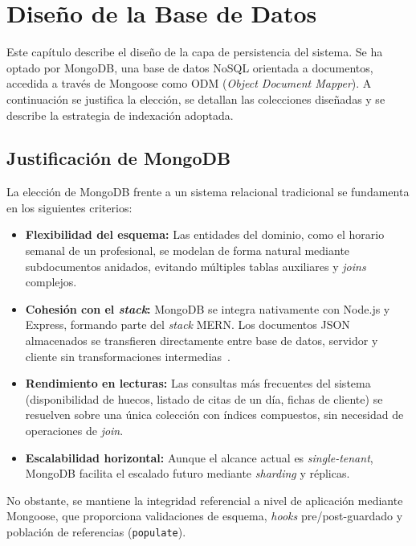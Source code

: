 
\chapter{Dise\~no de la Base de Datos}\label{cap:diseno-bd}

Este cap\'itulo describe el dise\~no de la capa de persistencia del sistema. Se ha optado por MongoDB, una base de datos NoSQL orientada a documentos, accedida a trav\'es de Mongoose como ODM (\textit{Object Document Mapper}). A continuaci\'on se justifica la elecci\'on, se detallan las colecciones dise\~nadas y se describe la estrategia de indexaci\'on adoptada.

\section{Justificaci\'on de MongoDB}\label{sec:justificacion-mongo}

La elecci\'on de MongoDB frente a un sistema relacional tradicional se fundamenta en los siguientes criterios:

\begin{itemize}
    \item \textbf{Flexibilidad del esquema:} Las entidades del dominio, como el horario semanal de un profesional, se modelan de forma natural mediante subdocumentos anidados, evitando m\'ultiples tablas auxiliares y \textit{joins} complejos.
    \item \textbf{Cohesi\'on con el \textit{stack}:} MongoDB se integra nativamente con Node.js y Express, formando parte del \textit{stack} MERN. Los documentos JSON almacenados se transfieren directamente entre base de datos, servidor y cliente sin transformaciones intermedias~\cite{mongodb_docs}.
    \item \textbf{Rendimiento en lecturas:} Las consultas m\'as frecuentes del sistema (disponibilidad de huecos, listado de citas de un d\'ia, fichas de cliente) se resuelven sobre una \'unica colecci\'on con \'indices compuestos, sin necesidad de operaciones de \textit{join}.
    \item \textbf{Escalabilidad horizontal:} Aunque el alcance actual es \textit{single-tenant}, MongoDB facilita el escalado futuro mediante \textit{sharding} y r\'eplicas.
\end{itemize}

No obstante, se mantiene la integridad referencial a nivel de aplicaci\'on mediante Mongoose, que proporciona validaciones de esquema, \textit{hooks} pre/post-guardado y poblaci\'on de referencias (\texttt{populate}).

